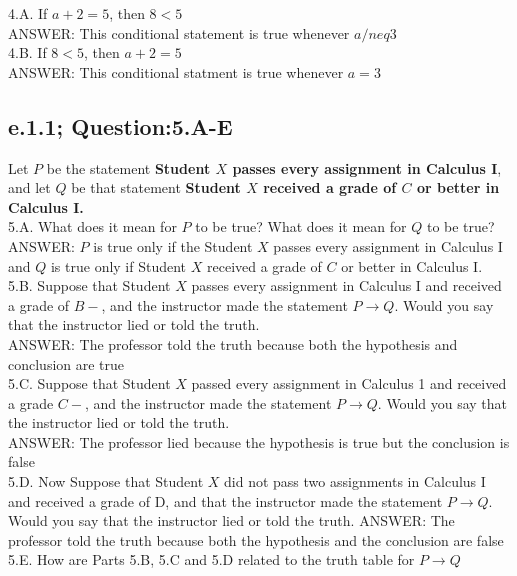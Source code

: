 4.A. If $a + 2 = 5$, then $8<5$ \\
	ANSWER: This conditional statement is true whenever $a /neq 3$ \\

4.B. If $8<5$, then $a + 2 = 5$ \\
	ANSWER: This conditional statment is true whenever $a = 3$ \\


\subsection{e.1.1; Question:5.A-E}

Let $P$ be the statement {\bf Student $X$ passes every assignment in Calculus I}, and let $Q$ be that statement {\bf Student $X$ received a grade of $C$ or better in Calculus I.} \\

5.A. What does it mean for $P$ to be true? What does it mean for $Q$ to be true? \\
	ANSWER: $P$ is true only if the Student $X$ passes every assignment in Calculus I and $Q$ is true only if Student $X$ received a grade of $C$ or better in Calculus I. \\

5.B. Suppose that Student $X$ passes every assignment in Calculus I and received a grade of $B-$, and the instructor made the statement $P \to Q$. Would you say that the instructor lied or told the truth. \\ 
	ANSWER: The professor told the truth because both the hypothesis and conclusion are true \\

5.C. Suppose that Student $X$ passed every assignment in Calculus 1 and received a grade $C-$, and the instructor made the statement $P \to Q$. Would you say that the instructor lied or told the truth. \\
	ANSWER: The professor lied because the hypothesis is true but the conclusion is false \\

5.D. Now Suppose that Student $X$ did not pass two assignments in Calculus I and received a grade of D, and that the instructor made the statement $P \to Q$. Would you say that the instructor lied or told the truth.
	ANSWER: The professor told the truth because both the hypothesis and the conclusion are false \\

5.E. How are Parts 5.B, 5.C and 5.D related to the truth table for $P \to Q$ \\


